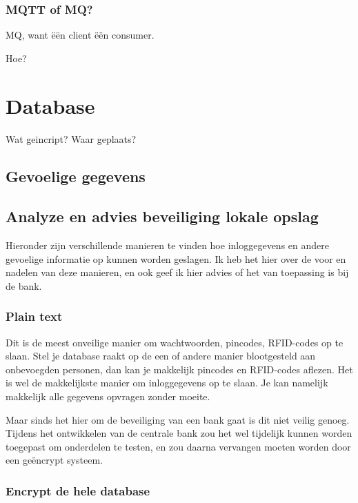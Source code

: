 \documentclass{article}
\begin{document}
\subsubsection{MQTT of MQ?}

MQ, want \"e\"en client \"e\"en consumer.

Hoe?

\section{Database}

Wat geincript?
Waar geplaats?

\newpage

\subsection{Gevoelige gegevens}

\subsection{Analyze en advies beveiliging lokale opslag} 

Hieronder zijn verschillende manieren te vinden hoe inloggegevens en andere gevoelige informatie op kunnen worden geslagen.
Ik heb het hier over de voor en nadelen van deze manieren, en ook geef ik hier advies of het van toepassing is bij de bank.

\subsubsection{Plain text}

Dit is de meest onveilige manier om wachtwoorden, pincodes, RFID-codes op te slaan.
Stel je database raakt op de een of andere manier blootgesteld aan onbevoegden personen, dan kan je makkelijk pincodes en RFID-codes aflezen. 
Het is wel de makkelijkste manier om inloggegevens op te slaan.
Je kan namelijk makkelijk alle gegevens opvragen zonder moeite.

Maar sinds het hier om de beveiliging van een bank gaat is dit niet veilig genoeg.
Tijdens het ontwikkelen van de centrale bank zou het wel tijdelijk kunnen worden toegepast om onderdelen te testen, en zou daarna vervangen moeten worden door een ge\"encrypt systeem.

\subsubsection{Encrypt de hele database}
\end{document}
